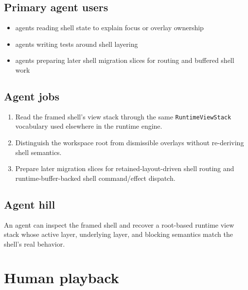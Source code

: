 \subsection{Primary agent users}\label{record-155-primary-agent-users}

\begin{itemize}
\tightlist
\item
  agents reading shell state to explain focus or overlay ownership
\item
  agents writing tests around shell layering
\item
  agents preparing later shell migration slices for routing and buffered shell work
\end{itemize}

\subsection{Agent jobs}\label{record-155-agent-jobs}

\begin{enumerate}
\def\labelenumi{\arabic{enumi}.}
\tightlist
\item
  Read the framed shell's view stack through the same \texttt{R\allowbreak{}u\allowbreak{}n\allowbreak{}t\allowbreak{}i\allowbreak{}m\allowbreak{}e\allowbreak{}V\allowbreak{}i\allowbreak{}e\allowbreak{}w\allowbreak{}S\allowbreak{}t\allowbreak{}a\allowbreak{}c\allowbreak{}k} vocabulary used elsewhere in the runtime engine.
\item
  Distinguish the workspace root from dismissible overlays without re-deriving shell semantics.
\item
  Prepare later migration slices for retained-layout-driven shell routing and runtime-buffer-backed shell command/effect dispatch.
\end{enumerate}

\subsection{Agent hill}\label{record-155-agent-hill}

An agent can inspect the framed shell and recover a root-based runtime view stack whose active layer, underlying layer, and blocking semantics match the shell's real behavior.

\section{Human playback}\label{record-155-human-playback}

